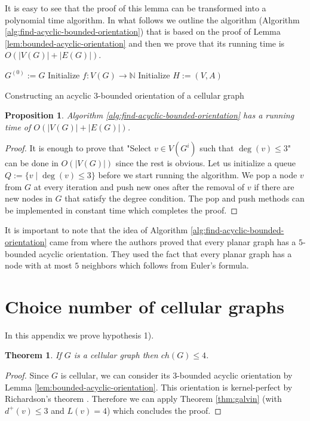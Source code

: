 \documentclass[letterpaper, 10 pt, conference]{ieeeconf}  %
\newtheorem{thm}{Theorem}
\newtheorem{prop}{Proposition}
\begin{document}
It is easy to see that the proof of this lemma can be transformed into a polynomial time algorithm. In what follows we outline the algorithm (Algorithm \ref{alg:find-acyclic-bounded-orientation}) that is based on the proof of Lemma \ref{lem:bounded-acyclic-orientation} and then we prove that its running time is $O(|V(G)| + |E(G)|)$.
\begin{algorithm}\label{alg:find-acyclic-bounded-orientation}
 $G^{(0)} := G$\;
 Initialize $f \colon V(G) \to \mathbb{N}$\;
 Initialize $H:=(V,A)$\;
 \caption{Constructing an acyclic $3$-bounded orientation of a cellular graph}
\end{algorithm}
\begin{prop} Algorithm \ref{alg:find-acyclic-bounded-orientation} has a running time of $O(|V(G)| + |E(G)|)$.
\end{prop}
\begin{proof}
It is enough to prove that "Select $v \in V(G^i)$ such that $\deg(v) \leqslant 3$" can be done in $O(|V(G)|)$ since the rest is obvious. Let us initialize a queue $Q := \lbrace v \mid \deg(v) \leqslant  3\rbrace$ before we start running the algorithm. We pop a node $v$ from $G$ at every iteration and push new ones after the removal of $v$ if there are new nodes in $G$ that satisfy the degree condition. The pop and push methods can be implemented in constant time which completes the proof.
\end{proof}
It is important to note that the idea of Algorithm \ref{alg:find-acyclic-bounded-orientation} came from \cite{CHROBAK1991243} where the authors proved that every planar graph has a $5$-bounded acyclic orientation. They used the fact that every planar graph has a node with at most $5$ neighbors which follows from Euler's formula.

\section{Choice number of cellular graphs}
In this appendix we prove hypothesis 1).
\begin{thm}\label{thm:choice-number}
If $G$ is a cellular graph then $ch(G) \leqslant 4$.
\end{thm}
\begin{proof}
Since $G$ is cellular, we can consider its $3$-bounded acyclic orientation by Lemma \ref{lem:bounded-acyclic-orientation}. This orientation is kernel-perfect by Richardson's theorem \cite{richardson1946}. Therefore we can apply Theorem \ref{thm:galvin} (with $d^+(v) \leqslant 3$ and $L(v)=4$) which concludes the proof.
\end{proof}
\end{document}

